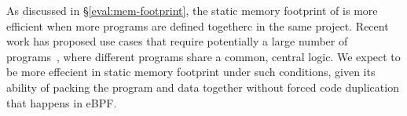 
As discussed in \S\ref{eval:mem-footprint}, the static memory footprint of
    \projname{} is more efficient when more programs are defined togetherc in
    the same project.
Recent work has proposed use cases that require potentially a large number of
    programs~\cite{ebpf-kcfi}, where different programs share a common, central
    logic.
We expect \projname{} to be more effecient in static memory footprint under
    such conditions, given its ability of packing the program and data together
    without forced code duplication that happens in eBPF.


